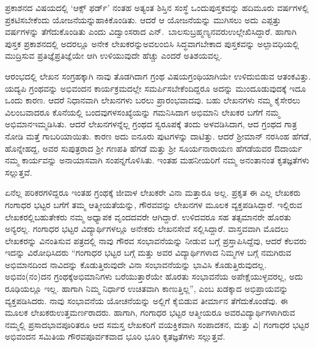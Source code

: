 {ಪ್ರಕಾಶನದ ವಿಷಯದಲ್ಲಿ ‘ಆಕ್ಸ್ ಫರ್ಡ್’ ನಂತಹ ಅತ್ಯಂತ ಶಿಸ್ತಿನ ಸಂಸ್ಥೆ ಒಂದು\break ಪುಸ್ತಕವನ್ನು ಹದಿಮೂರು ವರ್ಷಗಳಲ್ಲಿ ಪ್ರಕಟಿಸಬೇಕೆಂದು ಯೋಜನೆಯನ್ನು\break ಹಾಕಿಕೊಂಡಿತು. ಆದರೆ ಆ ಯೋಜನೆಯನ್ನು ಮುಗಿಸಲು ಅದು ಎಪ್ಪತ್ತು \hbox{ವರ್ಷಗಳನ್ನು} ತೆಗೆದುಕೊಂಡಿತು ಎಂದು ವಿದ್ವಾಂಸರಾದ ಎನ್.\ ಬಾಲಸುಬ್ರಹ್ಮಣ್ಯನವರು\break  ಉಲ್ಲೇಖಿಸಿದ್ದಾರೆ. ಹಾಗಾಗಿ ಪುಸ್ತಕ ಪ್ರಕಾಶನದಲ್ಲಿ ಅದರಲ್ಲೂ ಅನೇಕ ಲೇಖಕರನ್ನು\break ಅವಲಂಬಿಸಿ ಸಿದ್ಧವಾಗಬೇಕಾದ ಪುಸ್ತಕವನ್ನು ಅಲ್ಪಾವಧಿಯಲ್ಲಿ ಮುದ್ರಿಸುವ ಪ್ರತಿಜ್ಞೆ\break ಪ್ರತಿಜ್ಞೆಯೇ ಆಗಿ ಉಳಿಯುವುದೇ ಹೆಚ್ಚು ಎಂದರೆ ಅತಿಶಯವಲ್ಲ. 

ಆರಂಭದಲ್ಲಿ ಲೇಖನ ಸಂಗ್ರಹಕ್ಕಾಗಿ ನಾವು ತೊಡಗಿದಾಗ ಗ್ರಂಥ ವಿಷಯ\break ಗ್ರಂಥಿಯಾಗಿಯೇ ಉಳಿದುಬಿಡುವ ಆತಂಕವಿತ್ತು. ಯದ್ಯಪಿ ಗ್ರಂಥವನ್ನು ಅಭಿವಂದನ ಕಾರ್ಯಕ್ರಮದಲ್ಲೇ ಸಮರ್ಪಿಸಬೇಕೆಂದಿದ್ದರೂ ಅದನ್ನು ಮುಂದೂಡುವುದಕ್ಕೆ ಇದೂ ಒಂದು ಕಾರಣ. ಆದರೆ ನಿಧಾನವಾಗಿ ಲೇಖನಗಳು ಬರಲು ಪ್ರಾರಂಭವಾದವು. ಬಹು ಲೇಖನಗಳು ನಮ್ಮ ಕೈಸೇರಲು ವಿಲಂಬವಾದರೂ ಕೊನೆಯಲ್ಲಿ ಬಂದವುಗಳ\break ಸಂಖ್ಯೆಯನ್ನು ಗಮನಿಸಿದಾಗ ಅಭಿಮಾನಿ ಲೇಖಕರ ಬಗೆಗೆ ನಮ್ಮ ಅಭಿಮಾನ\break  ಇಮ್ಮಡಿಸಿತು. ಆದರೆ ಲೇಖನಗಳನ್ನೆಲ್ಲ ಗ್ರಂಥದ ಸ್ವರೂಪಕ್ಕೆ ತಂದು ಅಳವಡಿಸಿದಾಗ, ಆದ ಗ್ರಂಥದ ಗಾತ್ರ ನೋಡಿ ಮತ್ತೆ ಗಾಬರಿಯಾಯಿತು. ಕಾರಣ ಅದು ಐನೂರು ಪುಟಗಳನ್ನು ದಾಟಿತ್ತು. ಆದರೆ ಶ್ರೀಮಾನ್ ನರಸಿಂಹ ಹೆಗಡೆ, ಹೊನ್ನೇಹದ್ದ,  ಅವರ ಸುಪುತ್ರರಾದ ಶ್ರೀ ಗಣಪತಿ ಹೆಗಡೆ ಮತ್ತು ಶ್ರೀ ಸೂರ್ಯನಾರಾಯಣ ಹೆಗಡೆಯವರ ಔದಾರ್ಯ ನಮ್ಮ ಕಾರ್ಯವನ್ನು ಅನಾಯಾಸವಾಗಿ ಸಂಪನ್ನಗೊಳಿಸಿತು. ಇಂತಹ ಮಹನೀಯರಿಗೆ ನಮ್ಮ ಅನಂತಾನಂತ ಕೃತಜ್ಞತೆಗಳು ಸಲ್ಲುತ್ತವೆ. 

ಏನೆಲ್ಲ ಪರಿಕರಗಳಿದ್ದರೂ ಇಂತಹ ಗ್ರಂಥಕ್ಕೆ ಜೀವಾಳ ಲೇಖಕರೇ ವಿನಾ ಮತ್ತಾರೂ ಅಲ್ಲ. ಪ್ರಕೃತ ಈ ಎಲ್ಲ ಲೇಖಕರು ಗಂಗಾಧರ ಭಟ್ಟರ ಬಗೆಗೆ ತಮ್ಮ ಆತ್ಮೀಯತೆಯನ್ನು, ಗೌರವವನ್ನು ಲೇಖನಗಳ ಮೂಲಕ ವ್ಯಕ್ತಪಡಿಸಿದ್ದಾರೆ. ಇಲ್ಲಿರುವ ಲೇಖಕರಲ್ಲಿ\break  ಬಹುತೇಕರು ನಮ್ಮ ಅಧ್ಯಾಪಕ ವೃಂದದವರೇ ಆಗಿದ್ದಾರೆ. ಉಳಿದವರೂ ಸಹ ತತ್ಸಮಾನರೇ ಹೊರತು ಅನ್ಯರಲ್ಲ. ಗಂಗಾಧರ ಭಟ್ಟರ ವಿದ್ಯಾರ್ಥಿಗಳಲ್ಲೂ ಅನೇಕರು ಲೇಖನಸೇವೆ ಸಲ್ಲಿಸಿದ್ದಾರೆ. ವಾಸ್ತವವಾಗಿ ಮೊದಲು ಲೇಖಕರನ್ನು ವಿನಂತಿಸುವ ಪತ್ರದಲ್ಲಿ ನಾವು ಗೌರವ ಸಂಭಾವನೆಯನ್ನು ನೀಡುವ ಬಗ್ಗೆ ಪ್ರಸ್ತಾಪಿಸಿದ್ದೆವು, ಆದರೆ ಕೆಲವರು ಇದನ್ನು ವಿರೋಧಿಸಿದರು \enginline{-} “ಗಂಗಾಧರ ಭಟ್ಟರ ಬಗ್ಗೆ ಮತ್ತು ಅವರ ವಿದ್ಯಾರ್ಥಿಗಳಾದ ನಿಮ್ಮಗಳ ಬಗ್ಗೆ ನಮಗಿರುವ ಅಭಿಮಾನದಿಂದ ನಾವಿದನ್ನು ಕೊಡುತ್ತಿರುವುದೇ ವಿನಾ ಸಂಭಾವನೆಯನ್ನು ಭಾವಿಸಿ ಕೊಡುತ್ತಿರುವುದಲ್ಲ. ಅಭಿವಂ(ನಂ)ದನ ಗ್ರಂಥಕ್ಕೆ\break ಅಭಿಮಾನಿಗಳು ಬರೆಯುತ್ತಾರೆಯೇ ಹೊರತು ಸಂಭಾವನೆಯ ಅಪೇಕ್ಷೆಯುಳ್ಳವರಲ್ಲ, ಅದು ರೂಢಿಯಲ್ಲೂ ಇಲ್ಲ. ಹಾಗಾಗಿ ನಿಮ್ಮ ನಿರ್ಧಾರ ಉಚಿತವಾಗಿ ಕಾಣುತ್ತಿಲ್ಲ”, ಎಂಬ ಖಡಕ್ಕಾದ ಅಭಿಪ್ರಾಯವನ್ನು ವ್ಯಕ್ತಪಡಿಸಿದರು. ನಾವು ಸಂಭಾವನೆಯ ಯೋಚನೆಯನ್ನು ಅಲ್ಲಿಗೆ ಕೈಬಿಡುವ ತೀರ್ಮಾನ ತೆಗೆದುಕೊಂಡೆವು. ಈ ಮೂಲಕ ಲೇಖಕರು\break  ಉತ್ತಮರ್ಣರಾದರು. ಹಾಗಾಗಿ, ಗಂಗಾಧರ ಭಟ್ಟರ ಆತ್ಮೀಯರೂ ಅವರ\break  ವಿದ್ಯಾರ್ಥಿಗಳಾಗಿರುವ ನಮ್ಮಲ್ಲಿ ಪ್ರಸಾದಭಾವಪೂರಿತರೂ ಆದ ಸಮಸ್ತ ಲೇಖಕರಿಗೆ ವಯಕ್ತಿಕವಾಗಿ ಸಂಪಾದಕನ, ಮತ್ತು ವಿ| ಗಂಗಾಧರ ಭಟ್ಟರ ಅಭಿವಂದನ ಸಮಿತಿಯ ಗೌರವಪೂರ್ವಕವಾದ ಭೂರಿ ಭೂರಿ ಕೃತಜ್ಞತೆಗಳು ಸಲ್ಲುತ್ತವೆ.

}

